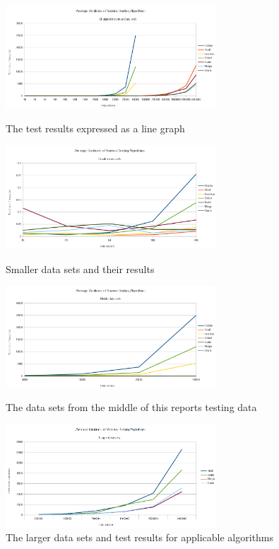 \documentclass{acm_proc_article-sp}
\begin{document}
\begin{figure}
\centering
\includegraphics[width=0.7\textwidth]{img/graph_all_tests.png}
\caption{The test results expressed as a line graph}

\includegraphics[width=0.7\textwidth]{img/graph_smaller.png}
\caption{Smaller data sets and their results}

\includegraphics[width=0.7\textwidth]{img/graph_middle.png}
\caption{The data sets from the middle of this reports testing data}

\includegraphics[width=0.7\textwidth]{img/graph_larger.png}
\caption{The larger data sets and test results for applicable algorithms}
\end{figure}

\balancecolumns
\clearpage
\end{document}
